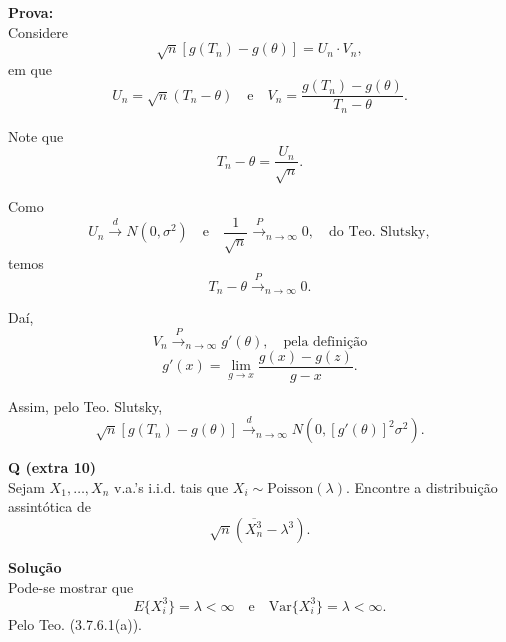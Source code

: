\textbf{Prova:} \\
Considere
\begin{equation}
\sqrt{n} \left[ g(T_n) - g(\theta) \right] = U_n \cdot V_n,
\end{equation}
em que
\begin{equation}
U_n = \sqrt{n} (T_n - \theta) \quad \text{e} \quad V_n = \frac{g(T_n) - g(\theta)}{T_n - \theta}.
\end{equation}

Note que 
\begin{equation}
T_n - \theta = \frac{U_n}{\sqrt{n}}.
\end{equation}

Como
\begin{equation}
U_n \xrightarrow{d} N(0, \sigma^2) \quad \text{e} \quad \frac{1}{\sqrt{n}} \xrightarrow{P}_{n \to \infty} 0, \quad \text{do Teo. Slutsky},
\end{equation}
temos
\begin{equation}
T_n - \theta \xrightarrow{P}_{n \to \infty} 0.
\end{equation}

Daí, 
\begin{equation}
V_n \xrightarrow{P}_{n \to \infty} g'(\theta), \quad \text{pela definição}
\end{equation}
\begin{equation}
g'(x) = \lim_{g \to x} \frac{g(x) - g(z)}{g - x}.
\end{equation}

Assim, pelo Teo. Slutsky,
\begin{equation}
\sqrt{n} \left[ g(T_n) - g(\theta) \right] \xrightarrow{d}_{n \to \infty} N\left(0, \left[ g'(\theta) \right]^2 \sigma^2 \right).
\end{equation}

\textbf{Q (extra 10)} \\
Sejam $X_1, \ldots, X_n$ v.a.'s i.i.d. tais que $X_i \sim \text{Poisson}(\lambda)$. Encontre a distribuição assintótica de 
\begin{equation}
\sqrt{n} \left( \overline{X_n^3} - \lambda^3 \right).
\end{equation}

\textbf{Solução} \\
Pode-se mostrar que
\begin{equation}
E\{ X_i^3 \} = \lambda < \infty \quad \text{e} \quad \text{Var}\{ X_i^3 \} = \lambda < \infty.
\end{equation}
Pelo Teo. (3.7.6.1(a)).